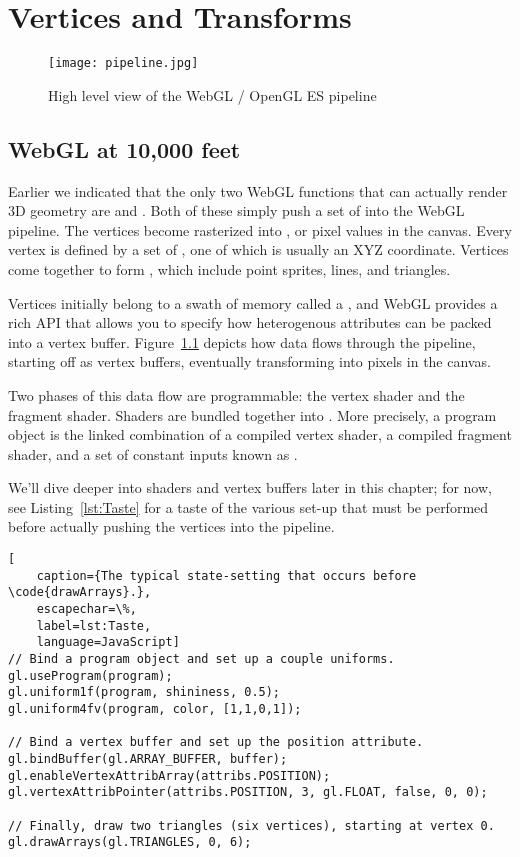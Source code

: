 \chapter{Vertices and Transforms}

\begin{figure}[htb]\centering
  \texttt{[image: pipeline.jpg]}
  \caption{High level view of the WebGL / OpenGL ES pipeline}
  \label{fig:AssemblyLine}
\end{figure}

\section{WebGL at 10,000 feet}

Earlier we indicated that the only two WebGL functions that can actually render 3D geometry are  and .  Both of these simply push a set of   into the WebGL pipeline.  The vertices become rasterized into  , or pixel values in the canvas.  Every vertex is defined by a set of , one of which is usually an XYZ coordinate.  Vertices come together to form , which include point sprites, lines, and triangles.

Vertices initially belong to a swath of memory called a , and WebGL provides a rich API that allows you to specify how heterogenous attributes can be packed into a vertex buffer.  Figure~\ref{fig:AssemblyLine} depicts how data flows through the pipeline, starting off as vertex buffers, eventually transforming into pixels in the canvas.

Two phases of this data flow are programmable: the vertex shader and the fragment shader.  Shaders are bundled together into  .   More precisely, a program object is the linked combination of a compiled vertex shader, a compiled fragment shader, and a set of constant inputs known as .

We'll dive deeper into shaders and vertex buffers later in this chapter; for now, see Listing~\ref{lst:Taste} for a taste of the various set-up that must be performed before actually pushing the vertices into the pipeline.

\begin{lstlisting}[
    caption={The typical state-setting that occurs before \code{drawArrays}.},
    escapechar=\%,
    label=lst:Taste,
    language=JavaScript]
// Bind a program object and set up a couple uniforms.
gl.useProgram(program);
gl.uniform1f(program, shininess, 0.5);
gl.uniform4fv(program, color, [1,1,0,1]);

// Bind a vertex buffer and set up the position attribute.
gl.bindBuffer(gl.ARRAY_BUFFER, buffer);
gl.enableVertexAttribArray(attribs.POSITION);
gl.vertexAttribPointer(attribs.POSITION, 3, gl.FLOAT, false, 0, 0);

// Finally, draw two triangles (six vertices), starting at vertex 0.
gl.drawArrays(gl.TRIANGLES, 0, 6);
\end{lstlisting}

